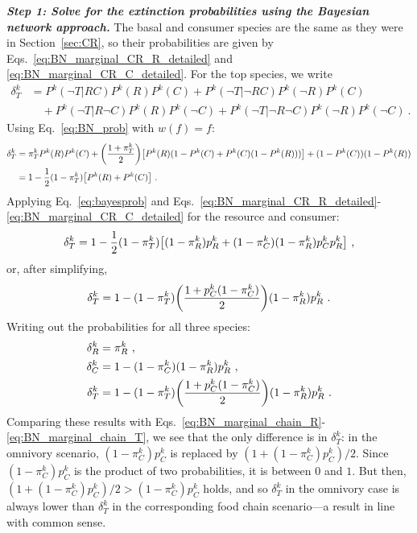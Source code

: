 \documentclass[11pt]{article}
\let\originalleft\left
\let\originalright\right
\renewcommand{\left}{\mathopen{}\mathclose\bgroup\originalleft}
\renewcommand{\right}{\aftergroup\egroup\originalright}
\begin{document}
\textit{\textbf{Step 1: Solve for the extinction probabilities using the Bayesian network approach.}}
The basal and consumer species are the same as they were in Section~\ref{sec:CR}, so their probabilities are given by Eqs.~\ref{eq:BN_marginal_CR_R_detailed} and \ref{eq:BN_marginal_CR_C_detailed}. For the top species, we write
\begin{equation}
  \label{eq:BN_marginal_omniv}
  \begin{split}
    \delta_T^k &= P^k(\neg T|R C) P^k(R) P^k(C) + P^k(\neg T|\neg R C)
    P^k(\neg R) P^k(C) \\ &\quad + P^k(\neg T|R \neg C) P^k(R) P^k(\neg C) +
    P^k(\neg T|\neg R \neg C) P^k(\neg R) P^k(\neg C) \ .
  \end{split}
\end{equation}
Using Eq.~\ref{eq:BN_prob} with $w(f)=f$:
\begin{equation}
  \label{eq:BN_marginal_omniv_2}
  \begin{split}
    \delta_T^k &= \pi_T^k P^k(R) P^k(C) + \left( \frac{1 + \pi_T^k}{2} \right)
    \left[ P^k(R) (1-P^k(C) + P^k(C) (1-P^k(R))) \right] + (1-P^k(C)) (1-P^k(R))
    \\ &= 1 - \frac{1}{2} (1 - \pi_T^k) \left[ P^k(R) + P^k(C) \right] \ .
  \end{split}
\end{equation}
Applying Eq.~\ref{eq:bayesprob} and Eqs.~\ref{eq:BN_marginal_CR_R_detailed}-\ref{eq:BN_marginal_CR_C_detailed} for the resource and consumer:
\begin{equation}
  \label{eq:BN_marginal_omniv_3}
  \delta_T^k = 1 - \frac{1}{2} (1 - \pi_T^k) \left[ (1-\pi_R^k) p_R^k +
    (1-\pi_C^k) (1-\pi_R^k) p_C^k p_R^k \right] \ ,
\end{equation}
or, after simplifying,
\begin{equation}
  \label{eq:BN_marginal_omniv_4}
  \delta_T^k = 1 - (1 - \pi_T^k) \left( \frac{1 + p_C^k (1-\pi_C^k)}{2} \right)
  (1-\pi_R^k) p_R^k \ .
\end{equation}
Writing out the probabilities for all three species:
\begin{align}
  \label{eq:BN_marginal_omniv_R}
  \delta_R^k &= \pi_R^k \ , \\
  \label{eq:BN_marginal_omniv_C}
  \delta_C^k & = 1 - (1-\pi_C^k) (1-\pi_R^k) p_R^k \ , \\
  \label{eq:BN_marginal_omniv_T}
  \delta_T^k &= 1 - (1 - \pi_T^k) \left( \frac{1 + p_C^k (1-\pi_C^k)}{2} \right)
               (1-\pi_R^k) p_R^k \ .
\end{align}
Comparing these results with Eqs.~\ref{eq:BN_marginal_chain_R}-\ref{eq:BN_marginal_chain_T}, we see that the only difference is in $\delta_T^k$: in the omnivory scenario, $(1 - \pi_C^k) p_C^k$ is replaced by $(1 + (1 - \pi_C^k) p_C^k) / 2$. Since $(1 - \pi_C^k) p_C^k$ is the product of two probabilities, it is between $0$ and $1$. But then, $(1 + (1 - \pi_C^k) p_C^k) / 2 > (1 - \pi_C^k) p_C^k$ holds, and so $\delta_T^k$ in the omnivory case is always lower than $\delta_T^k$ in the corresponding food chain scenario---a result in line with common sense.
\end{document}
